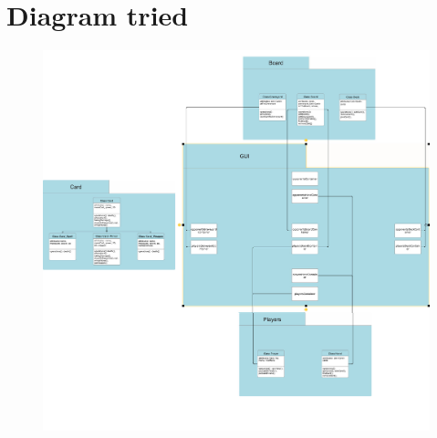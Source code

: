 \documentclass[12pt]{article}
\begin{document}
\section{Diagram tried}
\begin{figure}[h]
\centering 
\includegraphics[width=1\textwidth]{img/Diagram.jpg}
\end{figure}
\end{document}
